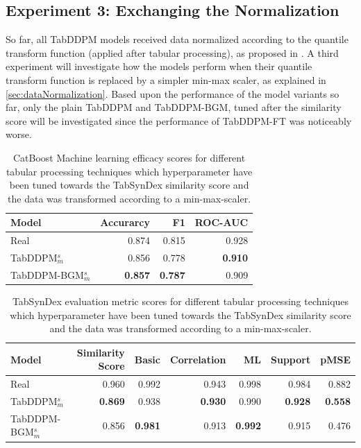 \subsection{Experiment 3: Exchanging the Normalization}
\label{ch:Experiment-3}

So far, all TabDDPM models received data normalized according to the quantile transform function (applied after tabular processing), as proposed in \cite{kotelnikov2022TabDDPMModellingTabular}.
A third experiment will investigate how the models perform when their quantile transform function is replaced by a simpler min-max scaler, as explained in \autoref{sec:dataNormalization}.
Based upon the performance of the model variants so far, only the plain TabDDPM and TabDDPM-BGM, tuned after the similarity score will be investigated since the performance of TabDDPM-FT was noticeably worse.


\begin{table}[h]
	\centering
	\begin{tabular}{lrrr}
		\toprule
		\textbf{Model}        & \textbf{Accurarcy} & \textbf{F1}    & \textbf{ROC-AUC} \\
		\midrule
		Real                  & 0.874              & 0.815          & 0.928            \\
		TabDDPM$^{s}_{m}$     & 0.856              & 0.778          & \textbf{0.910}   \\
		TabDDPM-BGM$^{s}_{m}$ & \textbf{0.857}     & \textbf{0.787} & 0.909            \\
		\bottomrule
	\end{tabular}
	\caption[Experiment3-ML-Efficacy]{CatBoost Machine learning efficacy scores for different tabular processing techniques which hyperparameter have been tuned towards the TabSynDex similarity score
		and the data was transformed according to a min-max-scaler.}
	\label{tab:exp3-ml}
\end{table}

\begin{table}[h]
	\centering
	\begin{tabular}{lrrrrrr}
		\toprule
		\textbf{Model}        & \textbf{Similarity Score} & \textbf{Basic} & \textbf{Correlation} & \textbf{ML}    & \textbf{Support} & \textbf{pMSE}  \\
		\midrule
		Real                  & 0.960                     & 0.992          & 0.943                & 0.998          & 0.984            & 0.882          \\
		TabDDPM$^{s}_{m}$     & \textbf{0.869}            & 0.938          & \textbf{0.930}       & 0.990          & \textbf{0.928}   & \textbf{0.558} \\
		TabDDPM-BGM$^{s}_{m}$ & 0.856                     & \textbf{0.981} & 0.913                & \textbf{0.992} & 0.915            & 0.476          \\
		\bottomrule
	\end{tabular}
	\caption[Experiment3-Similarity]{TabSynDex evaluation metric scores for different tabular processing techniques which hyperparameter have been tuned towards the TabSynDex similarity score
		and the data was transformed according to a min-max-scaler.}
	\label{tab:exp3-sim}
\end{table}

